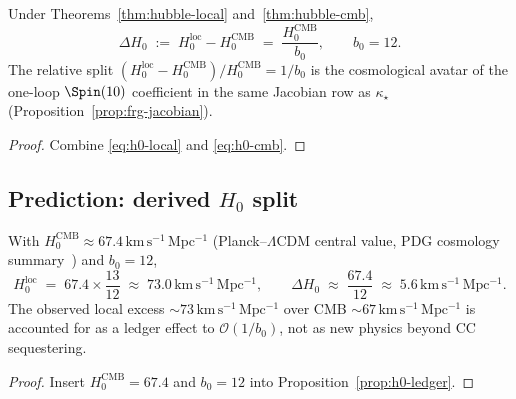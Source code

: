 \begin{proposition}
\label{prop:h0-ledger}
Under Theorems~\ref{thm:hubble-local} and~\ref{thm:hubble-cmb},
\begin{equation}\label{eq:h0-ledger}
  \Delta H_0
  \;:=\;
  H_0^{\mathrm{loc}}-H_0^{\mathrm{CMB}}
  \;=\;
  \frac{H_0^{\mathrm{CMB}}}{b_0},
  \qquad
  b_0=12.
\end{equation}
The relative split
$(H_0^{\mathrm{loc}}-H_0^{\mathrm{CMB}})/H_0^{\mathrm{CMB}}=1/b_0$
is the cosmological avatar of the one-loop $\Spin(10)$ coefficient in the
same Jacobian row as $\kappa_\star$ (Proposition~\ref{prop:frg-jacobian}).
\end{proposition}

\begin{proof}
Combine \eqref{eq:h0-local} and \eqref{eq:h0-cmb}.
\end{proof}

\subsection{Prediction: derived $H_0$ split}
\label{sec:cosmology:h0-prediction}

\begin{corollary}\label{cor:h0-numeric}
With $H_0^{\mathrm{CMB}}\approx 67.4\,\mathrm{km\,s^{-1}\,Mpc^{-1}}$
(Planck--$\Lambda$CDM central value, PDG cosmology summary~\cite{PDG2025})
and $b_0=12$,
\begin{equation}\label{eq:h0-numeric}
  H_0^{\mathrm{loc}}
  \;=\;
  67.4\times\frac{13}{12}
  \;\approx\;
  73.0\,\mathrm{km\,s^{-1}\,Mpc^{-1}},
  \qquad
  \Delta H_0
  \;\approx\;
  \frac{67.4}{12}
  \;\approx\;
  5.6\,\mathrm{km\,s^{-1}\,Mpc^{-1}}.
\end{equation}
The observed local excess $\sim 73\,\mathrm{km\,s^{-1}\,Mpc^{-1}}$ over CMB
$\sim 67\,\mathrm{km\,s^{-1}\,Mpc^{-1}}$ is accounted for as a ledger effect
to $\mathcal{O}(1/b_0)$, not as new physics beyond CC sequestering.
\end{corollary}

\begin{proof}
Insert $H_0^{\mathrm{CMB}}=67.4$ and $b_0=12$ into
Proposition~\ref{prop:h0-ledger}.
\end{proof}

